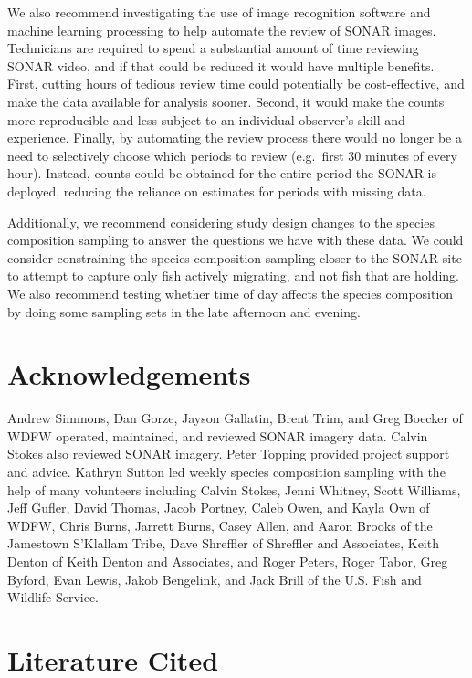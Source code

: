 \documentclass[
]{article}
\begin{document}
We also recommend investigating the use of image recognition software and machine learning processing to help automate the review of SONAR images. Technicians are required to spend a substantial amount of time reviewing SONAR video, and if that could be reduced it would have multiple benefits. First, cutting hours of tedious review time could potentially be cost-effective, and make the data available for analysis sooner. Second, it would make the counts more reproducible and less subject to an individual observer's skill and experience. Finally, by automating the review process there would no longer be a need to selectively choose which periods to review (e.g.~first 30 minutes of every hour). Instead, counts could be obtained for the entire period the SONAR is deployed, reducing the reliance on estimates for periods with missing data.

Additionally, we recommend considering study design changes to the species composition sampling to answer the questions we have with these data. We could consider constraining the species composition sampling closer to the SONAR site to attempt to capture only fish actively migrating, and not fish that are holding. We also recommend testing whether time of day affects the species composition by doing some sampling sets in the late afternoon and evening.

\hypertarget{acknowledgements}{%
\section{Acknowledgements}\label{acknowledgements}}

Andrew Simmons, Dan Gorze, Jayson Gallatin, Brent Trim, and Greg Boecker of WDFW operated, maintained, and reviewed SONAR imagery data. Calvin Stokes also reviewed SONAR imagery. Peter Topping provided project support and advice. Kathryn Sutton led weekly species composition sampling with the help of many volunteers including Calvin Stokes, Jenni Whitney, Scott Williams, Jeff Gufler, David Thomas, Jacob Portney, Caleb Owen, and Kayla Own of WDFW, Chris Burns, Jarrett Burns, Casey Allen, and Aaron Brooks of the Jamestown S'Klallam Tribe, Dave Shreffler of Shreffler and Associates, Keith Denton of Keith Denton and Associates, and Roger Peters, Roger Tabor, Greg Byford, Evan Lewis, Jakob Bengelink, and Jack Brill of the U.S. Fish and Wildlife Service.

\hypertarget{literature-cited}{%
\section{Literature Cited}\label{literature-cited}}
\end{document}
